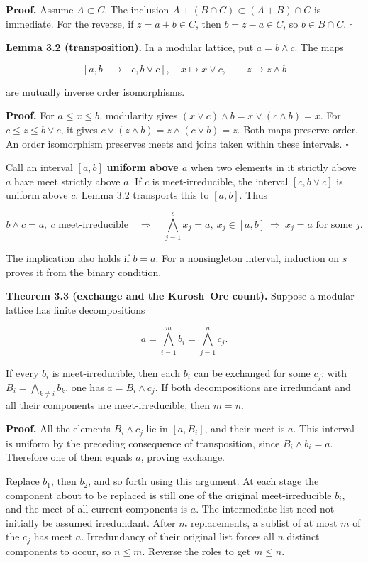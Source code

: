 \documentclass[
]{article}
\begin{document}
\textbf{Proof.} Assume \(A\subset C\). The inclusion
\(A+(B\cap C)\subset(A+B)\cap C\) is immediate. For the reverse, if
\(z=a+b\in C\), then \(b=z-a\in C\), so \(b\in B\cap C\). \(\square\)

\textbf{Lemma 3.2 (transposition).} In a modular lattice, put
\(a=b\wedge c\). The maps

\[
[a,b]\longrightarrow[c,b\vee c],\quad x\longmapsto x\vee c,
\qquad z\longmapsto z\wedge b
\]

are mutually inverse order isomorphisms.

\textbf{Proof.} For \(a\le x\le b\), modularity gives
\((x\vee c)\wedge b=x\vee(c\wedge b)=x\). For \(c\le z\le b\vee c\), it
gives \(c\vee(z\wedge b)=z\wedge(c\vee b)=z\). Both maps preserve order.
An order isomorphism preserves meets and joins taken within these
intervals. \(\square\)

Call an interval \([a,b]\) \textbf{uniform above \(a\)} when two
elements in it strictly above \(a\) have meet strictly above \(a\). If
\(c\) is meet-irreducible, the interval \([c,b\vee c]\) is uniform above
\(c\). Lemma 3.2 transports this to \([a,b]\). Thus

\[
b\wedge c=a,\ c\text{ meet-irreducible}
\quad\Longrightarrow\quad
\bigwedge_{j=1}^s x_j=a,\ x_j\in[a,b]
\ \Longrightarrow\ x_j=a\text{ for some }j.
\]

The implication also holds if \(b=a\). For a nonsingleton interval,
induction on \(s\) proves it from the binary condition.

\textbf{Theorem 3.3 (exchange and the Kurosh--Ore count).} Suppose a
modular lattice has finite decompositions

\[
a=\bigwedge_{i=1}^m b_i=\bigwedge_{j=1}^n c_j.
\]

If every \(b_i\) is meet-irreducible, then each \(b_i\) can be exchanged
for some \(c_j\): with \(B_i=\bigwedge_{k\ne i}b_k\), one has
\(a=B_i\wedge c_j\). If both decompositions are irredundant and all
their components are meet-irreducible, then \(m=n\).

\textbf{Proof.} All the elements \(B_i\wedge c_j\) lie in \([a,B_i]\),
and their meet is \(a\). This interval is uniform by the preceding
consequence of transposition, since \(B_i\wedge b_i=a\). Therefore one
of them equals \(a\), proving exchange.

Replace \(b_1\), then \(b_2\), and so forth using this argument. At each
stage the component about to be replaced is still one of the original
meet-irreducible \(b_i\), and the meet of all current components is
\(a\). The intermediate list need not initially be assumed irredundant.
After \(m\) replacements, a sublist of at most \(m\) of the \(c_j\) has
meet \(a\). Irredundancy of their original list forces all \(n\)
distinct components to occur, so \(n\le m\). Reverse the roles to get
\(m\le n\).
\end{document}

